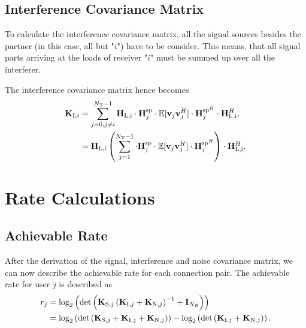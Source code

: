 \subsection{Interference Covariance Matrix}
\label{sec:int_cov}

To calculate the interference covariance matrix, all the signal sources besides the partner (in this case, all but "$i$") have to be consider.
This means, that all signal parts arriving at the loads of receiver "$i$" must be summed up over all the interferer.

The interference covariance matrix hence becomes 
\begin{align}
\label{eq:interf_cov}\nonumber
\mat{K}_{\text{I},i}%
 	&= \sum_{j=0,j\neq i}^{N_\text{T}-1} 
	\mat{H}_\text{L,i} \cdot \mat{H}_{j}^{\text{sp}} \cdot 
	\mathbb{E}[\vec{v}_{j}\vec{v}_{j}^H] \cdot 
	\mat{H}_{j}^{\text{sp}^H} \cdot \mat{H}_\text{L,i}^H,\\
	&= \mat{H}_\text{L,i} \left(\sum_{j=1}^{N_\text{T}-1} 
	\cdot \mat{H}_{j}^{\text{sp}} \cdot 
	\mathbb{E}[\vec{v}_{j}\vec{v}_{j}^H] \cdot 
	\mat{H}_{j}^{\text{sp}^H}\right) \cdot \mat{H}_\text{L,i}^H.
\end{align}





\section{Rate Calculations}
\label{sec:rates}

\subsection{Achievable Rate}
\label{sec:achiev_rate}
After the derivation of the signal, interference and noise covariance matrix, we can now describe the achievable rate for each connection pair.
The achievable rate for user $j$ is described as
\begin{align}
\label{eq:achiev_rate}
\nonumber
r_j &= \text{log}_2\left(\text{det}\left(\mathbf{K}_{\text{S},j}\left(\mathbf{K}_{\text{I},j}+\mathbf{K}_{\text{N},j}\right)^{-1}+\mathbf{I}_{N_R}\right)\right)\\
 &=\text{log}_2\left(
	\text{det}\left(\mathbf{K}_{\text{S},j}+
		\mathbf{K}_{\text{I},j}+\mathbf{K}_{\text{N},j}\right)\right) -
	\text{log}_2\left(\text{det}\left(\mathbf{K}_{\text{I},j}+\mathbf{K}_{\text{N},j}\right)\right).
\end{align}

